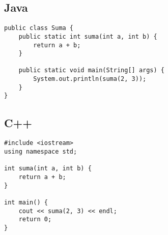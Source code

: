 \documentclass[12pt,a4paper]{report}
\begin{document}
\subsection{Java}
\begin{lstlisting}[style=style2, caption={Ejemplo de código Java}]
public class Suma {
    public static int suma(int a, int b) {
        return a + b;
    }

    public static void main(String[] args) {
        System.out.println(suma(2, 3));
    }
}
\end{lstlisting}

\subsection{C++}
\begin{lstlisting}[style=style3, caption={Ejemplo de código C++}]
#include <iostream>
using namespace std;

int suma(int a, int b) {
    return a + b;
}

int main() {
    cout << suma(2, 3) << endl;
    return 0;
}
\end{lstlisting}
\end{document}
